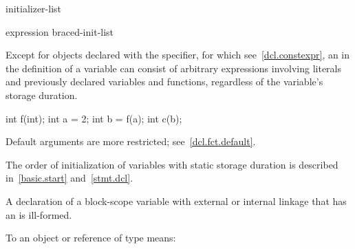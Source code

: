 \begin{bnf}
\br
    \terminal{\{} initializer-list \terminal{,\opt} \terminal{\}}\br
    \terminal{\{} \terminal{\}}
\end{bnf}

\begin{bnf}
\br
    expression\br
    braced-init-list
\end{bnf}

\pnum
Except for objects declared with the  specifier, for which see~\ref{dcl.constexpr},
an  in the definition of a variable can consist of
arbitrary
%
%
expressions involving literals and previously declared
variables and functions,
regardless of the variable's storage duration.
\begin{example}

\begin{codeblock}
int f(int);
int a = 2;
int b = f(a);
int c(b);
\end{codeblock}
\end{example}

\pnum
\begin{note}
Default arguments are more restricted; see~\ref{dcl.fct.default}.

\pnum
The order of initialization of variables with static storage duration is described in~\ref{basic.start}
and~\ref{stmt.dcl}.
\end{note}

\pnum
A declaration of a block-scope variable with external or internal
linkage that has an  is ill-formed.

\pnum
{}%
%
%
%
%
To
an object or reference of type
means:

